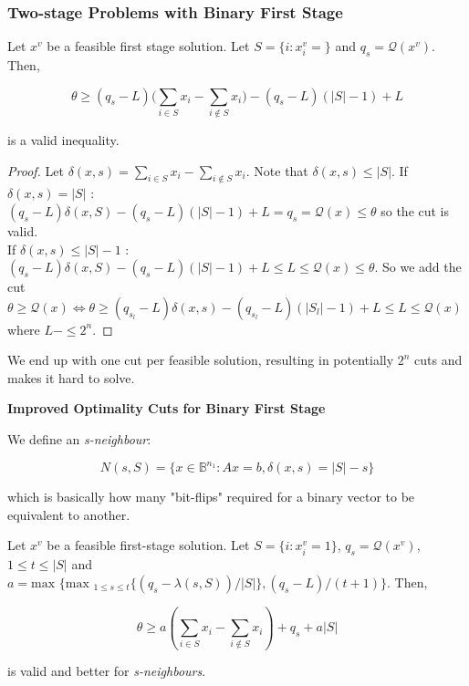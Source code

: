 \subsubsection{Two-stage Problems with Binary First Stage}

\begin{proposition}
Let $x^v$ be a feasible first stage solution. Let $S=\{ i: x_i^v = \}$ and
$q_s = \mathscr{Q}(x^v)$. Then,

\[
\theta \geq (q_s - L) \big(\sum_{i\in S}x_i - \sum_{i\notin S}x_i\big) -(q_s-L)(|S|-1)+L
\]

is a valid inequality.
\end{proposition}

\begin{proof}
Let $\delta(x,s) = \sum_{i\in S}x_i - \sum_{i\notin S} x_i$. Note that $\delta(x,s) \leq |S|$.
If $\delta(x,s) = |S|$ : $(q_s -L)\delta(x,S) - (q_s -L)(|S|-1)+L = q_s = \mathscr{Q}(x)\leq 
\theta$ so the cut is valid.\\
If $\delta(x,s) \leq |S|-1$ : $(q_s -L)\delta(x,S) - (q_s -L)(|S|-1)+L \leq L \leq \mathscr{Q}(x)
\leq \theta$.
So we add the cut $\theta \geq \mathscr{Q}(x) \Leftrightarrow \theta \geq (q_{s_l} -L)\delta(x,s) - (q_{s_l}-L)(|S_l|-1)+L \leq L \leq \mathscr{Q}(x)$ where $L -\leq 2^n$.

\end{proof}

We end up with one cut per feasible solution, resulting in potentially $2^n$ cuts and makes
it hard to solve.

\textbf{Improved Optimality Cuts for Binary First Stage}

We define an \emph{s-neighbour}:

\[
N(s,S) = \{ x\in \mathbb{B}^{n_1} : Ax=b, \delta(x,s) = |S|-s \}
\]

which is basically how many "bit-flips" required for a binary vector to be equivalent to
another.

\begin{proposition}
Let $x^v$ be a feasible first-stage solution. Let $S=\{i : x_i^v = 1\}$, $q_s = \mathscr{Q}(x^v)$,
$1 \leq t \leq |S|$ and $a = \textrm{max } \big\{\textrm{max }_{1\leq s\leq t} \{ (q_s -\lambda(s,S))/|S|\},
(q_s - L)/(t+1)\big\}$. Then,

\[
\theta \geq a(\sum_{i\in S} x_i - \sum_{i\notin S} x_i) + q_s + a|S|
\]

is valid and better for \emph{s-neighbours}.
\end{proposition}

